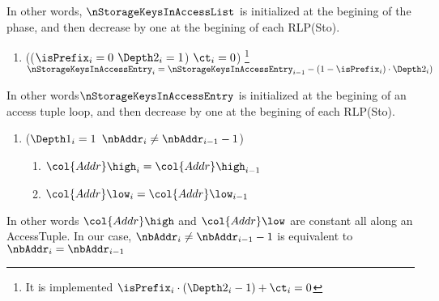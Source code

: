 In other words, $\nStorageKeysInAccessList$ is initialized at the begining of the phase, and then decrease by one at the begining of each RLP(Sto).
\begin{enumerate}[resume]
	\item \If (($\isPrefix_{i}=0$ \Or $\Depth2_{i}=1$) \et $\ct_{i}=0$) \footnote{It is implemented \If $\isPrefix_{i} \cdot (\Depth2_{i}-1) +\ct_{i} =0$ \Then} \Then $\nStorageKeysInAccessEntry_{i} = \nStorageKeysInAccessEntry_{i-1} - (1- \isPrefix_{i}) \cdot \Depth2_{i})$
\end{enumerate}
In other words$\nStorageKeysInAccessEntry$ is initialized at the begining of an access tuple loop, and then decrease by one at the begining of each RLP(Sto).
\begin{enumerate}[resume]
	\item \If ($\Depth1_{i}=1$ \et $\nbAddr_{i} \neq \nbAddr_{i-1} -1$) \Then 
		\begin{enumerate}
			\item $\col{Addr}\high_{i} = \col{Addr}\high_{i-1}$
			\item $\col{Addr}\low_{i} = \col{Addr}\low_{i-1}$
		\end{enumerate}
\end{enumerate}
In other words $\col{Addr}\high$ and $\col{Addr}\low$ are constant all along an AccessTuple.
\saNote{} In our case, $\nbAddr_{i} \neq \nbAddr_{i-1} -1$ is equivalent to $\nbAddr_{i} = \nbAddr_{i-1}$

